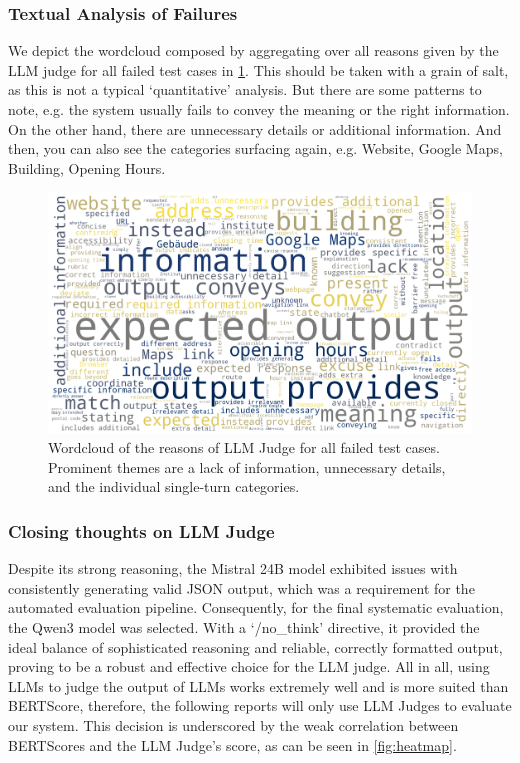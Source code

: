 \documentclass{article}
\begin{document}
\subsubsection{Textual Analysis of Failures}

We depict the wordcloud composed by aggregating over all reasons given by the LLM judge for all failed test cases in \cref{fig:word-cloud}. This should be taken with a grain of salt, as this is not a typical `quantitative' analysis. But there are some patterns to note, e.g. the system usually fails to convey the meaning or the right information. On the other hand, there are unnecessary details or additional information. And then, you can also see the categories surfacing again, e.g. Website, Google Maps, Building, Opening Hours.\\

\begin{figure}[htb]
    \centering
    \includegraphics[width=1.0\linewidth]{docs/phase2/plots/failure_reason_wordcloud.png}
    \caption{Wordcloud of the reasons of LLM Judge for all failed test cases. Prominent themes are a lack of information, unnecessary details, and the individual single-turn categories.}
    \label{fig:word-cloud}
\end{figure}




\subsubsection{Closing thoughts on LLM Judge}

Despite its strong reasoning, the Mistral 24B model exhibited issues with consistently generating valid JSON output, which was a requirement for the automated evaluation pipeline. Consequently, for the final systematic evaluation, the Qwen3 model was selected. With a `/no\_think' directive, it provided the ideal balance of sophisticated reasoning and reliable, correctly formatted output, proving to be a robust and effective choice for the LLM judge. All in all, using LLMs to judge the output of LLMs works extremely well and is more suited than BERTScore, therefore, the following reports will only use LLM Judges to evaluate our system. This decision is underscored by the weak correlation between BERTScores and the LLM Judge's score, as can be seen in \cref{fig:heatmap}.\\
\end{document}
